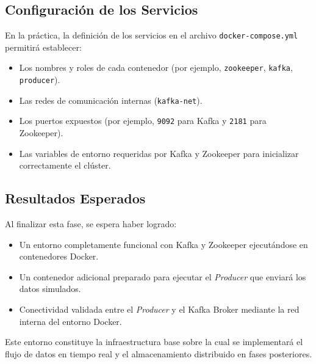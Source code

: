 \documentclass[12pt,a4paper]{article}
\begin{document}





\subsection{Configuración de los Servicios}
En la práctica, la definición de los servicios en el archivo \texttt{docker-compose.yml} permitirá establecer:
\begin{itemize}
    \item Los nombres y roles de cada contenedor (por ejemplo, \texttt{zookeeper}, \texttt{kafka}, \texttt{producer}).
    \item Las redes de comunicación internas (\texttt{kafka-net}).
    \item Los puertos expuestos (por ejemplo, \texttt{9092} para Kafka y \texttt{2181} para Zookeeper).
    \item Las variables de entorno requeridas por Kafka y Zookeeper para inicializar correctamente el clúster.
\end{itemize}

\subsection{Resultados Esperados}
Al finalizar esta fase, se espera haber logrado:
\begin{itemize}
    \item Un entorno completamente funcional con Kafka y Zookeeper ejecutándose en contenedores Docker.
    \item Un contenedor adicional preparado para ejecutar el \textit{Producer} que enviará los datos simulados.
    \item Conectividad validada entre el \textit{Producer} y el Kafka Broker mediante la red interna del entorno Docker.
\end{itemize}

Este entorno constituye la infraestructura base sobre la cual se implementará el flujo de datos en tiempo real y el almacenamiento distribuido en fases posteriores.
\end{document}
